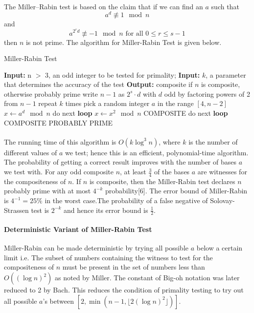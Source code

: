 \documentclass[paper=a4, fontsize=11pt]{scrartcl}	%
\numberwithin{equation}{section}		%
\numberwithin{figure}{section}		%
\numberwithin{table}{section}		%
\begin{document}
\paragraph{}The Miller--Rabin test is based on the claim that if we can find an $a$ such that
\[a^d \not\equiv 1 \mod n\] and
\[a^{2^rd} \not\equiv -1 \mod n \text{	 for all } 0 \leq r \leq s-1\]
then $n$ is not prime. The algorithm for Miller-Rabin Test is given below.
\begin{algorithm}
\caption{Miller-Rabin Test}
\label{alg3}
\begin{algorithmic}[-3]
\STATE \textbf{Input:} n $>$ 3, an odd integer to be tested for primality;
\STATE \textbf{Input:} $k$, a parameter that determines the accuracy of the test
\STATE \textbf{Output:} composite if $n$ is composite, otherwise probably prime
\STATE write $n -1$ as $2^s\cdot d$ with $d$ odd by factoring powers of 2 from $n-1$
\LOOP
\STATE repeat $k$ times
\STATE pick a random integer $a$ in the range $[4, n-2]$
\STATE $x \leftarrow a^d \mod n$
\STATE do next \textbf{loop}
\ENDIF
{}
\STATE $x \leftarrow x^2 \mod n$
\RETURN COMPOSITE
\ENDIF
{}
\STATE do next \textbf{loop}
\ENDIF
\ENDFOR
\RETURN COMPOSITE
\ENDLOOP
\RETURN PROBABLY PRIME
\end{algorithmic}
\end{algorithm}
\paragraph{}The running time of this algorithm is $O(k \log^3n)$, where $k$ is the number of different values of $a$ we test; hence this is an efficient, polynomial-time algorithm. The probability of getting a correct result improves with the number of bases $a$ we test with. For any odd composite $n$, at least $\frac{3}{4}$ of the bases $a$ are witnesses for the compositeness of $n$. If $n$ is composite, then the Miller-Rabin test declares $n$ probably prime with at most $4^{-k} $ probability[6]. The error bound of Miller-Rabin is $4^{-1} = 25 \%$ in the worst case.The probability of a false negative of Solovay-Strassen test is $2^{-k}$ and hence its error bound is $\frac{1}{2}.$ \\

\paragraph{Deterministic Variant of Miller-Rabin Test}
Miller-Rabin can be made deterministic by trying all possible $a$ below a certain limit i.e. The subset of numbers containing the witness to test for the compositeness of $n$ must be present in the set of numbers less than $O((\log n)^2)$ as noted by Miller. The constant of Big-oh notation was later reduced to 2 by Bach. This reduces the condition of primality testing to try out all possible $a$'s between $[2, \min(n-1, \lfloor2(\log n)^2\rfloor)]$. 
\end{document}

